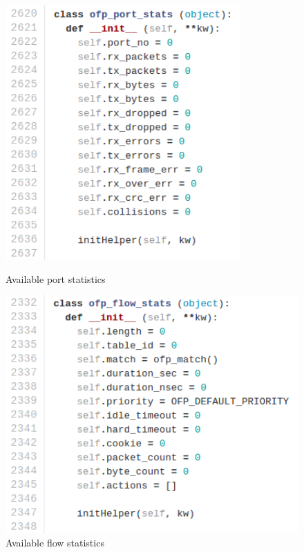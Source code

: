 \documentclass[12pt,english,oneside]{book}
\begin{document}
\begin{figure}[h!tbp]
\centering
\begin{minipage}{.5\textwidth}
  \centering
  \includegraphics[width=0.8\textwidth]{figures/stats_portstats.png}
  \caption{Available port statistics}
  \label{fig:stats_portstats}
\end{minipage}%
\begin{minipage}{.5\textwidth}
  \centering
  \includegraphics[width=1\textwidth]{figures/stats_flowstats.png}
  \caption{Available flow statistics}
  \label{fig:stats_flowstats}
\end{minipage}%
\end{figure}
\end{document}
